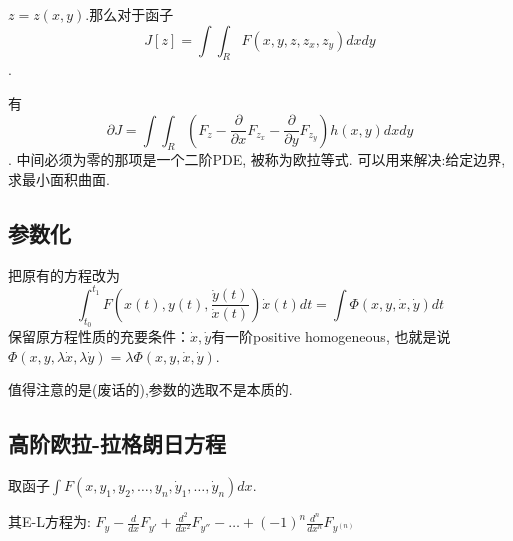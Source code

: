\(z = z(x,y)\).那么对于函子
\[J[z] = \int\int_R F(x,y,z,z_x,z_y)dxdy\].

有
\[\partial J = \int\int_R(F_z - \frac{\partial}{\partial x}F_{z_x} - \frac{\partial}{\partial y}F_{z_y} )h(x,y)dxdy\].
中间必须为零的那项是一个二阶PDE, 被称为欧拉等式. 可以用来解决:给定边界,求最小面积曲面.

\subsection{参数化}

把原有的方程改为
\[\int_{t_0}^{t_1} F(x(t),y(t),\frac{\dot y(t)}{\dot x(t)}) \dot x(t) dt = \int \Phi(x,y,\dot x,\dot y)dt\]
保留原方程性质的充要条件：\(\dot x, \dot y\)有一阶positive homogeneous,
也就是说\(\Phi(x,y,\lambda\dot x,\lambda\dot y) = \lambda \Phi(x,y,\dot x, \dot y)\).

值得注意的是(废话的),参数的选取不是本质的.

\subsection{高阶欧拉-拉格朗日方程}

取函子\(\int F(x,y_1,y_2,\dots,y_n,\dot y_1,\dots,\dot y_n)dx\).

其E-L方程为: \(F_{y} - \frac{d}{dx}F_{y'} + \frac{d^2}{dx^2}F_{y''} - \dots + (-1)^n \frac{d^n}{dx^n} F_{y^{(n)}}\)
